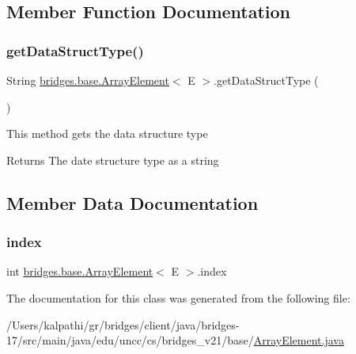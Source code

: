 \subsection{Member Function Documentation}
\mbox{\label{classbridges_1_1base_1_1_array_element_a1d4f3fae7bd986237e364c2cce0bea77}} 
\subsubsection{\texorpdfstring{get\+Data\+Struct\+Type()}{getDataStructType()}}
{\footnotesize\ttfamily String \mbox{\hyperlink{classbridges_1_1base_1_1_array_element}{bridges.\+base.\+Array\+Element}}$<$ E $>$.get\+Data\+Struct\+Type (\begin{DoxyParamCaption}{ }\end{DoxyParamCaption})}

This method gets the data structure type

\begin{DoxyReturn}{Returns}
The date structure type as a string 
\end{DoxyReturn}


\subsection{Member Data Documentation}
\mbox{\label{classbridges_1_1base_1_1_array_element_a79c69e5046da8c297026d1e457a23182}} 
\subsubsection{\texorpdfstring{index}{index}}
{\footnotesize\ttfamily int \mbox{\hyperlink{classbridges_1_1base_1_1_array_element}{bridges.\+base.\+Array\+Element}}$<$ E $>$.index\hspace{0.3cm}{\ttfamily [static]}}



The documentation for this class was generated from the following file\+:\begin{DoxyCompactItemize}
\item 
/\+Users/kalpathi/gr/bridges/client/java/bridges-\/17/src/main/java/edu/uncc/cs/bridges\+\_\+v21/base/\mbox{\hyperlink{_array_element_8java}{Array\+Element.\+java}}\end{DoxyCompactItemize}
